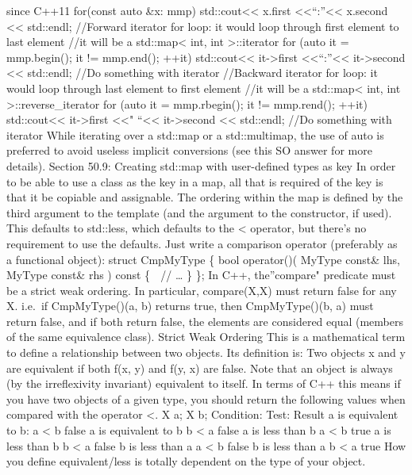 since C++11 for(const auto \&x: mmp) std::cout\textless\textless{}
x.first \textless\textless{}``:''\textless\textless{} x.second
\textless\textless{} std::endl; //Forward iterator for loop: it would
loop through first element to last element //it will be a
std::map\textless{} int, int \textgreater::iterator for (auto it =
mmp.begin(); it != mmp.end(); ++it) std::cout\textless\textless{}
it-\textgreater first \textless\textless{}``:''\textless\textless{}
it-\textgreater second \textless\textless{} std::endl; //Do something
with iterator //Backward iterator for loop: it would loop through last
element to first element //it will be a std::map\textless{} int, int
\textgreater::reverse\_iterator for (auto it = mmp.rbegin(); it !=
mmp.rend(); ++it) std::cout\textless\textless{} it-\textgreater first
\textless\textless" ``\textless\textless{} it-\textgreater second
\textless\textless{} std::endl; //Do something with iterator While
iterating over a std::map or a std::multimap, the use of auto is
preferred to avoid useless implicit conversions (see this SO answer for
more details). Section 50.9: Creating std::map with user-deﬁned types as
key In order to be able to use a class as the key in a map, all that is
required of the key is that it be copiable and assignable. The ordering
within the map is deﬁned by the third argument to the template (and the
argument to the constructor, if used). This defaults to std::less, which
defaults to the \textless{} operator, but there's no requirement to use
the defaults. Just write a comparison operator (preferably as a
functional object): struct CmpMyType \{ bool operator()( MyType const\&
lhs, MyType const\& rhs ) const \{  // \ldots{} \} \}; In C++,
the''compare" predicate must be a strict weak ordering. In particular,
compare(X,X) must return false for any X. i.e.~if CmpMyType()(a, b)
returns true, then CmpMyType()(b, a) must return false, and if both
return false, the elements are considered equal (members of the same
equivalence class). Strict Weak Ordering This is a mathematical term to
deﬁne a relationship between two objects. Its deﬁnition is: Two objects
x and y are equivalent if both f(x, y) and f(y, x) are false. Note that
an object is always (by the irreﬂexivity invariant) equivalent to
itself. In terms of C++ this means if you have two objects of a given
type, you should return the following values when compared with the
operator \textless. X a; X b; Condition: Test: Result a is equivalent to
b: a \textless{} b false a is equivalent to b b \textless{} a false a is
less than b a \textless{} b true a is less than b b \textless{} a false
b is less than a a \textless{} b false b is less than a b \textless{} a
true How you deﬁne equivalent/less is totally dependent on the type of
your object.

